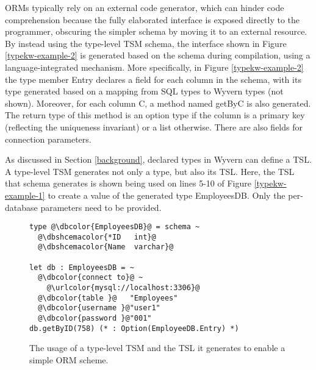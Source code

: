 \documentclass{sig-alternate}[10pt]
\makeatletter
\newcommand\BeraMonottfamily{%
  \def\fvm@Scale{0.85}%
  \fontfamily{fvm}\selectfont%
}
\newcommand{\urlcolor}[1]{\textcolor[HTML]{FFCC33}{#1}}
\newcommand{\dbcolor}[1]{\textcolor[HTML]{2F276F}{#1}}
\newcommand{\dbshcemacolor}[1]{\textcolor[HTML]{0A5306}{#1}}
\newcommand{\mycaption}[1]{\vspace{-5px}\caption{#1}\vspace{-5px}}
\newcommand{\lstinlinew}[1]{{\scriptsize\BeraMonottfamily #1}}
\makeatother
\begin{document}
ORMs typically rely on an external code generator, which can hinder code comprehension because the fully elaborated interface is exposed directly to the programmer, obscuring the simpler schema by moving it to an external resource. By instead using the type-level TSM \lstinlinew{schema}, the interface shown in Figure \ref{typekw-example-2} is generated based on the schema during compilation, using a language-integrated mechanism. More specifically, in Figure \ref{typekw-example-2} the type member \lstinlinew{Entry} declares a field for each column in the schema, with its type generated based on a mapping from SQL types to Wyvern types (not shown). Moreover, for each column \lstinlinew{C}, a method named \lstinlinew{getByC} is also generated. The return type of this method is an option type if the column is a primary key (reflecting the uniqueness invariant) or a list otherwise. There are also fields for connection parameters. 

As discussed in Section \ref{background}, declared types in Wyvern can define a TSL. A type-level TSM   generates not only a type, but also its TSL. Here, the TSL that \lstinlinew{schema} generates is shown being used on lines 5-10 of Figure \ref{typekw-example-1} to create a value of the generated type \lstinlinew{EmployeesDB}. Only the per-database parameters need to be provided. %

\begin{figure}[t]
\begin{lstlisting}[style=wyvern]
type @\dbcolor{EmployeesDB}@ = schema ~
  @\dbshcemacolor{*ID   int}@
  @\dbshcemacolor{Name  varchar}@

let db : EmployeesDB = ~
  @\dbcolor{connect to}@ ~
    @\urlcolor{mysql://localhost:3306}@
  @\dbcolor{table }@   "Employees"
  @\dbcolor{username }@"user1"
  @\dbcolor{password }@"001"
db.getByID(758) (* : Option(EmployeeDB.Entry) *)
\end{lstlisting}
\mycaption{The usage of a type-level TSM and the TSL it generates to enable a simple ORM scheme.}
\label{f-tykwexample}
\end{figure}
\end{document}
